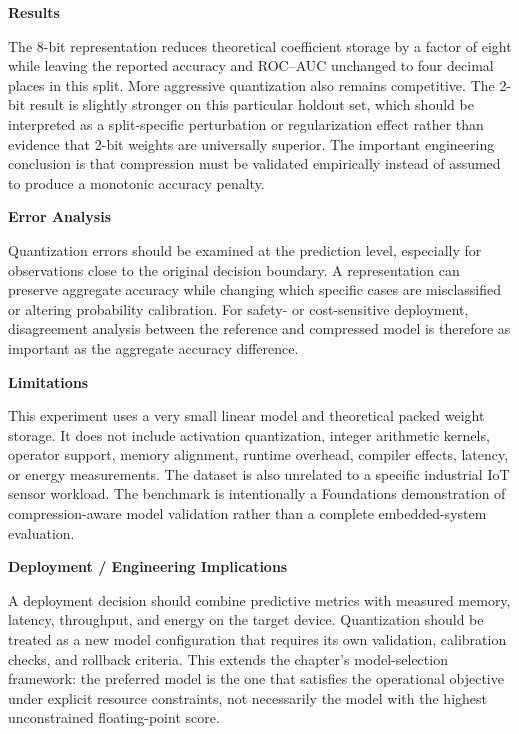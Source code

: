 \textbf{Results}

The 8-bit representation reduces theoretical coefficient storage by a factor of eight while leaving the reported accuracy and ROC--AUC unchanged to four decimal places in this split. More aggressive quantization also remains competitive. The 2-bit result is slightly stronger on this particular holdout set, which should be interpreted as a split-specific perturbation or regularization effect rather than evidence that 2-bit weights are universally superior. The important engineering conclusion is that compression must be validated empirically instead of assumed to produce a monotonic accuracy penalty.

\textbf{Error Analysis}

Quantization errors should be examined at the prediction level, especially for observations close to the original decision boundary. A representation can preserve aggregate accuracy while changing which specific cases are misclassified or altering probability calibration. For safety- or cost-sensitive deployment, disagreement analysis between the reference and compressed model is therefore as important as the aggregate accuracy difference.

\textbf{Limitations}

This experiment uses a very small linear model and theoretical packed weight storage. It does not include activation quantization, integer arithmetic kernels, operator support, memory alignment, runtime overhead, compiler effects, latency, or energy measurements. The dataset is also unrelated to a specific industrial IoT sensor workload. The benchmark is intentionally a Foundations demonstration of compression-aware model validation rather than a complete embedded-system evaluation.

\textbf{Deployment / Engineering Implications}

A deployment decision should combine predictive metrics with measured memory, latency, throughput, and energy on the target device. Quantization should be treated as a new model configuration that requires its own validation, calibration checks, and rollback criteria. This extends the chapter's model-selection framework: the preferred model is the one that satisfies the operational objective under explicit resource constraints, not necessarily the model with the highest unconstrained floating-point score.
